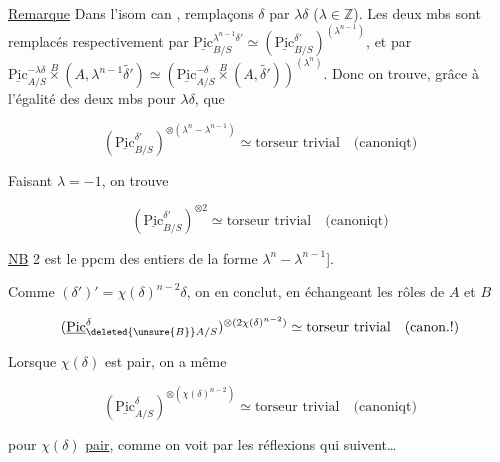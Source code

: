 
\uline{Remarque} Dans l'isom can \unsure{$(*)$}, remplaçons $\delta$ par $\lambda\delta$ ($\lambda\in\mathbb Z$). Les deux mbs sont remplacés respectivement par $\underline{\mathrm{Pic}}^{\lambda^{n-1}\delta'}_{B/S}\simeq(\underline{\mathrm{Pic}}^{\delta'}_{B/S})^{(\lambda^{n-1})}$, et par $\underline{\mathrm{Pic}}^{-\lambda\delta}_{A/S}\overset B\times(A,\lambda^{n-1}\widetilde{\delta'})\simeq(\underline{\mathrm{Pic}}^{-\delta}_{A/S}\overset B\times(A,\widetilde{\delta'}))^{(\lambda^n)}$. Donc on trouve, grâce à l'égalité des deux mbs pour $\lambda\delta$, que

\[
(\underline{\mathrm{Pic}}^{\delta'}_{B/S})^{\otimes(\lambda^n-\lambda^{n-1})}\simeq\text{torseur trivial}\quad\text{(canoniqt)}
\]

Faisant $\lambda=-1$, on trouve

\[
(\underline{\mathrm{Pic}}^{\delta'}_{B/S})^{\otimes2}\simeq\text{torseur trivial}\quad\text{(canoniqt)}
\]


\uline{NB} 2 est le ppcm des entiers de la forme $\lambda^n-\lambda^{n-1}$].

 Comme $(\delta')'=\chi(\delta)^{n-2}\delta$, on en conclut, en échangeant les rôles de $A$ et $B$

\[
(\underline{\mathrm{Pic}}^\delta_{\deleted{\unsure{B}}A/S})^{\otimes(2\chi(\delta)^{n-2})}\simeq\text{torseur trivial}\quad\text{(canon.!)}
\]


Lorsque $\chi(\delta)$ est pair, on a même

\[
(\underline{\mathrm{Pic}}^\delta_{A/S})^{\otimes(\chi(\delta)^{n-2})}\simeq\text{torseur trivial}\quad\text{(canoniqt)}
\]

pour $\chi(\delta)$ \uline{pair}, comme on voit par les réflexions qui suivent\ldots


